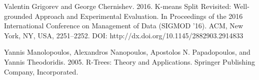 \documentclass{beamer}
\begin{document}
\begin{frame}[allowframebreaks]
{\begin{thebibliography}{99}
 Valentin Grigorev and George Chernishev. 2016. K-means Split Revisited: Well-grounded Approach and Experimental Evaluation. In Proceedings of the 2016 International Conference on Management of Data (SIGMOD '16). ACM, New York, NY, USA, 2251--2252. DOI: http://dx.doi.org/10.1145/2882903.2914833 

 Yannis Manolopoulos, Alexandros Nanopoulos, Apostolos N. Papadopoulos, and Yannis Theodoridis. 2005. R-Trees: Theory and Applications. Springer Publishing Company, Incorporated. 









\end{thebibliography}}
\end{frame}
\end{document}
